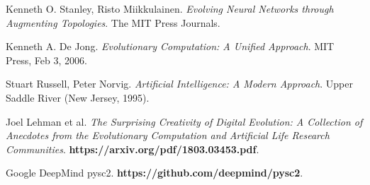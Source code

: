 \documentclass{article}
\begin{document}
\begin{thebibliography}{9}
  Kenneth O. Stanley, Risto Miikkulainen.
  \textit{Evolving Neural Networks through Augmenting Topologies}. 
  The MIT Press Journals.

  Kenneth A. De Jong. \textit{Evolutionary Computation: A Unified Approach}.
  MIT Press, Feb 3, 2006.

  Stuart Russell, Peter Norvig.
  \textit{Artificial Intelligence: A Modern Approach}.
  Upper Saddle River (New Jersey, 1995).

  Joel Lehman et al.
  \textit{The Surprising Creativity of Digital Evolution: A Collection of
    Anecdotes from the Evolutionary Computation and Artificial Life Research
    Communities}.
  \textbf{https://arxiv.org/pdf/1803.03453.pdf}.

  Google DeepMind pysc2.
  \textbf{https://github.com/deepmind/pysc2}.

\end{thebibliography}
\end{document}
